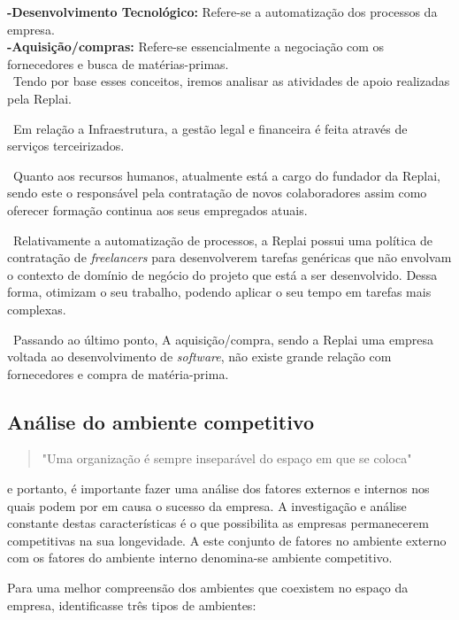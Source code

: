 \textbf{-Desenvolvimento Tecnológico:} Refere-se a automatização dos processos da empresa. \\

\textbf{-Aquisição/compras:} Refere-se essencialmente a negociação com os fornecedores e busca de matérias-primas.\\

\ Tendo por base esses conceitos, iremos analisar as atividades de apoio realizadas pela Replai.

\ Em relação a Infraestrutura, a gestão legal e financeira é feita através de serviços terceirizados.

\ Quanto aos recursos humanos, atualmente está a cargo do fundador da Replai, sendo este o responsável pela contratação de novos colaboradores assim como oferecer formação continua aos seus empregados atuais.

\ Relativamente a automatização de processos, a Replai possui uma política de contratação de \textit{freelancers} para desenvolverem tarefas genéricas que não envolvam o contexto de domínio de negócio do projeto que está a ser desenvolvido. Dessa forma, otimizam o seu trabalho, podendo aplicar o seu tempo em tarefas mais complexas.

\ Passando ao último ponto, A aquisição/compra, sendo a Replai uma empresa voltada ao desenvolvimento de \textit{software}, não existe grande relação com fornecedores e compra de matéria-prima. 





\subsection{Análise do ambiente competitivo}
\begin{quote}
    "Uma organização é sempre inseparável do espaço em que se coloca"\cite{Planeamento}
\end{quote} e portanto, é importante fazer uma análise dos fatores externos e internos nos quais podem por em causa o sucesso da empresa. A investigação e análise constante destas características  é o que possibilita as empresas permanecerem competitivas na sua longevidade. A este conjunto de fatores no ambiente externo com os fatores do ambiente interno denomina-se ambiente competitivo.

Para uma melhor compreensão dos ambientes que coexistem no espaço da empresa, identificasse três tipos de ambientes: \\

